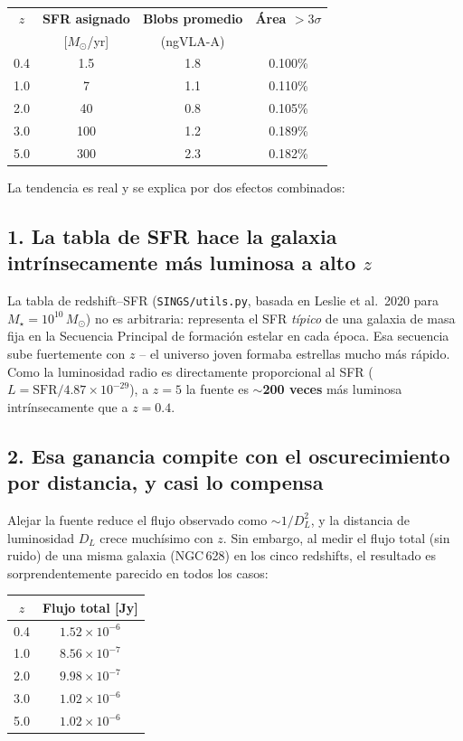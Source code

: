 \documentclass[12pt, a4paper]{article}
\begin{document}
\begin{center}
\begin{tabular}{cccc}
\toprule
$z$ & \textbf{SFR asignado} & \textbf{Blobs promedio} & \textbf{Área $>3\sigma$} \\
    & [$M_\odot$/yr] & (ngVLA-A) & \\
\midrule
0.4 & 1.5  & 1.8 & 0.100\% \\
1.0 & 7    & 1.1 & 0.110\% \\
2.0 & 40   & 0.8 & 0.105\% \\
3.0 & 100  & 1.2 & 0.189\% \\
5.0 & 300  & 2.3 & 0.182\% \\
\bottomrule
\end{tabular}
\end{center}

La tendencia es real y se explica por dos efectos combinados:

\subsection{1. La tabla de SFR hace la galaxia intrínsecamente más luminosa a alto \texorpdfstring{$z$}{z}}

La tabla de redshift--SFR (\texttt{SINGS/utils.py}, basada en
Leslie et al.\ 2020 para $M_\star = 10^{10}\,M_\odot$) no es arbitraria:
representa el SFR \textit{típico} de una galaxia de masa fija en la
Secuencia Principal de formación estelar en cada época. Esa secuencia sube
fuertemente con $z$ -- el universo joven formaba estrellas mucho más rápido.
Como la luminosidad radio es directamente proporcional al SFR
($L = \mathrm{SFR}/4.87\times10^{-29}$), a $z=5$ la fuente es
\textbf{$\sim$200 veces} más luminosa intrínsecamente que a $z=0.4$.

\subsection{2. Esa ganancia compite con el oscurecimiento por distancia, y casi lo compensa}

Alejar la fuente reduce el flujo observado como $\sim 1/D_L^2$, y la
distancia de luminosidad $D_L$ crece muchísimo con $z$. Sin embargo, al medir
el flujo total (sin ruido) de una misma galaxia (NGC\,628) en los cinco
redshifts, el resultado es sorprendentemente parecido en todos los casos:

\begin{center}
\begin{tabular}{cc}
\toprule
$z$ & \textbf{Flujo total} [Jy] \\
\midrule
0.4 & $1.52\times10^{-6}$ \\
1.0 & $8.56\times10^{-7}$ \\
2.0 & $9.98\times10^{-7}$ \\
3.0 & $1.02\times10^{-6}$ \\
5.0 & $1.02\times10^{-6}$ \\
\bottomrule
\end{tabular}
\end{center}
\end{document}
